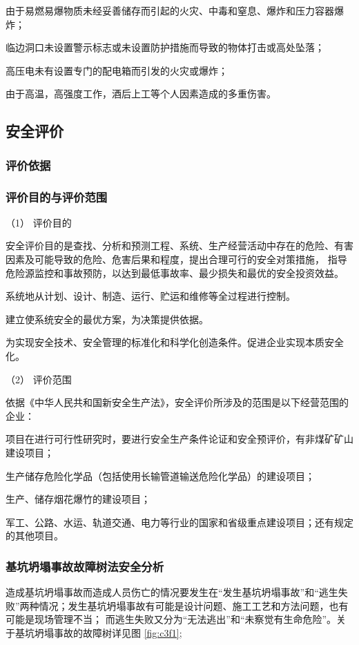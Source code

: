  由于易燃易爆物质未经妥善储存而引起的火灾、中毒和窒息、爆炸和压力容器爆炸；

 临边洞口未设置警示标志或未设置防护措施而导致的物体打击或高处坠落；

 高压电未有设置专门的配电箱而引发的火灾或爆炸；

 由于高温，高强度工作，酒后上工等个人因素造成的多重伤害。

\subsection{安全评价}
\subsubsection{评价依据}
\subsubsection{评价目的与评价范围}

（1） 评价目的

安全评价目的是查找、分析和预测工程、系统、生产经营活动中存在的危险、有害因素及可能导致的危险、危害后果和程度，提出合理可行的安全对策措施，
指导危险源监控和事故预防，以达到最低事故率、最少损失和最优的安全投资效益。

 系统地从计划、设计、制造、运行、贮运和维修等全过程进行控制。

  建立使系统安全的最优方案，为决策提供依据。

 为实现安全技术、安全管理的标准化和科学化创造条件。促进企业实现本质安全化。

（2） 评价范围

依据《中华人民共和国新安全生产法》，安全评价所涉及的范围是以下经营范围的企业：

 项目在进行可行性研究时，要进行安全生产条件论证和安全预评价，有非煤矿矿山建设项目；

 生产储存危险化学品（包括使用长输管道输送危险化学品）的建设项目；

 生产、储存烟花爆竹的建设项目；

 军工、公路、水运、轨道交通、电力等行业的国家和省级重点建设项目；还有规定的其他项目。

\subsubsection{基坑坍塌事故故障树法安全分析}

造成基坑坍塌事故而造成人员伤亡的情况要发生在“发生基坑坍塌事故”和“逃生失败”两种情况；发生基坑坍塌事故有可能是设计问题、施工工艺和方法问题，也有可能是现场管理不当；
而逃生失败又分为“无法逃出”和“未察觉有生命危险”。关于基坑坍塌事故的故障树详见图 \ref{fig:c3f1};

